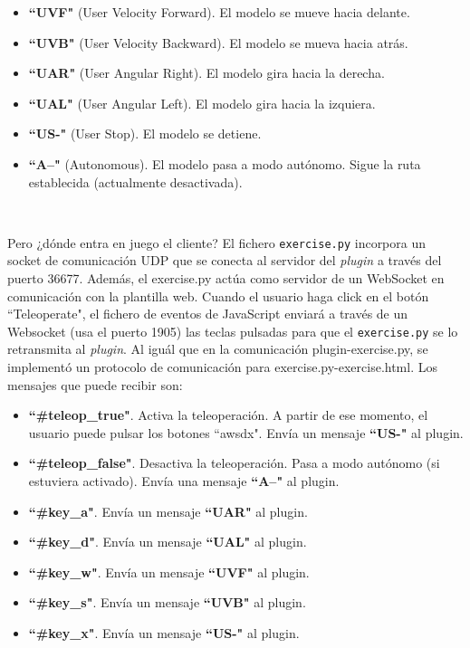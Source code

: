 \begin{itemize}
	\item \textbf{``UVF"} (User Velocity Forward). El modelo se mueve hacia delante.
	\item \textbf{``UVB"} (User Velocity Backward). El modelo se mueva hacia atrás.
	\item \textbf{``UAR"} (User Angular Right). El modelo gira hacia la derecha.
	\item \textbf{``UAL"} (User Angular Left). El modelo gira hacia la izquiera.
	\item \textbf{``US-"} (User Stop). El modelo se detiene.
	\item \textbf{``A--"} (Autonomous). El modelo pasa a modo autónomo. Sigue la ruta establecida (actualmente desactivada).
\end{itemize}\

Pero ¿dónde entra en juego el cliente? El fichero \texttt{exercise.py} incorpora un socket de comunicación UDP que se conecta al servidor del \textit{plugin} a través del puerto 36677. Además, el exercise.py actúa como servidor de un WebSocket en comunicación con la plantilla web. Cuando el usuario haga click en el botón ``Teleoperate", el fichero de eventos de JavaScript enviará a través de un Websocket (usa el puerto 1905) las teclas pulsadas para que el \texttt{exercise.py} se lo retransmita al \textit{plugin}. Al iguál que en la comunicación plugin-exercise.py, se implementó un protocolo de comunicación para exercise.py-exercise.html. Los mensajes que puede recibir son:\\

\begin{itemize}
	\item \textbf{``\#teleop\_true"}. Activa la teleoperación. A partir de ese momento, el usuario puede pulsar los botones ``awsdx". Envía un mensaje \textbf{``US-"} al plugin.
	\item \textbf{``\#teleop\_false"}. Desactiva la teleoperación. Pasa a modo autónomo (si estuviera activado). Envía una mensaje \textbf{``A--"} al plugin.
	\item \textbf{``\#key\_a"}. Envía un mensaje \textbf{``UAR"} al plugin.
	\item \textbf{``\#key\_d"}. Envía un mensaje \textbf{``UAL"} al plugin.
	\item \textbf{``\#key\_w"}. Envía un mensaje \textbf{``UVF"} al plugin.
	\item \textbf{``\#key\_s"}. Envía un mensaje \textbf{``UVB"} al plugin.
	\item \textbf{``\#key\_x"}. Envía un mensaje \textbf{``US-"} al plugin.
\end{itemize}\

